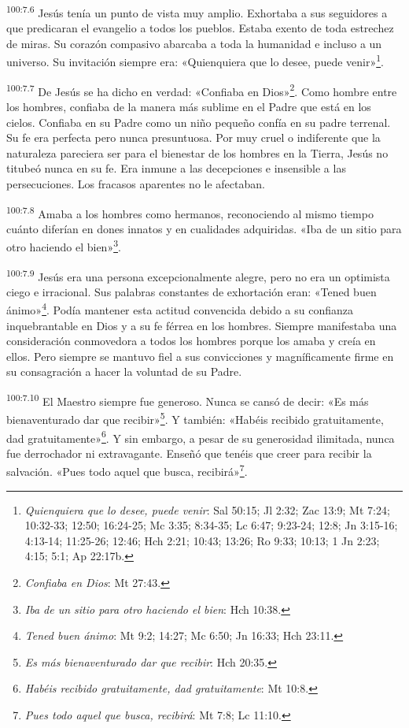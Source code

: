 \par
\textsuperscript{100:7.6} Jesús tenía un punto de vista muy amplio. Exhortaba a sus seguidores a que predicaran el evangelio a todos los pueblos. Estaba exento de toda estrechez de miras. Su corazón compasivo abarcaba a toda la humanidad e incluso a un universo. Su invitación siempre era: «Quienquiera que lo desee, puede venir»\footnote{\textit{Quienquiera que lo desee, puede venir}: Sal 50:15; Jl 2:32; Zac 13:9; Mt 7:24; 10:32-33; 12:50; 16:24-25; Mc 3:35; 8:34-35; Lc 6:47; 9:23-24; 12:8; Jn 3:15-16; 4:13-14; 11:25-26; 12:46; Hch 2:21; 10:43; 13:26; Ro 9:33; 10:13; 1 Jn 2:23; 4:15;  5:1; Ap 22:17b.}.

\par
\textsuperscript{100:7.7} De Jesús se ha dicho en verdad: «Confiaba en Dios»\footnote{\textit{Confiaba en Dios}: Mt 27:43.}. Como hombre entre los hombres, confiaba de la manera más sublime en el Padre que está en los cielos. Confiaba en su Padre como un niño pequeño confía en su padre terrenal. Su fe era perfecta pero nunca presuntuosa. Por muy cruel o indiferente que la naturaleza pareciera ser para el bienestar de los hombres en la Tierra, Jesús no titubeó nunca en su fe. Era inmune a las decepciones e insensible a las persecuciones. Los fracasos aparentes no le afectaban.

\par
\textsuperscript{100:7.8} Amaba a los hombres como hermanos, reconociendo al mismo tiempo cuánto diferían en dones innatos y en cualidades adquiridas. «Iba de un sitio para otro haciendo el bien»\footnote{\textit{Iba de un sitio para otro haciendo el bien}: Hch 10:38.}.

\par
\textsuperscript{100:7.9} Jesús era una persona excepcionalmente alegre, pero no era un optimista ciego e irracional. Sus palabras constantes de exhortación eran: «Tened buen ánimo»\footnote{\textit{Tened buen ánimo}: Mt 9:2; 14:27; Mc 6:50; Jn 16:33; Hch 23:11.}. Podía mantener esta actitud convencida debido a su confianza inquebrantable en Dios y a su fe férrea en los hombres. Siempre manifestaba una consideración conmovedora a todos los hombres porque los amaba y creía en ellos. Pero siempre se mantuvo fiel a sus convicciones y magníficamente firme en su consagración a hacer la voluntad de su Padre.

\par
\textsuperscript{100:7.10} El Maestro siempre fue generoso. Nunca se cansó de decir: «Es más bienaventurado dar que recibir»\footnote{\textit{Es más bienaventurado dar que recibir}: Hch 20:35.}. Y también: «Habéis recibido gratuitamente, dad gratuitamente»\footnote{\textit{Habéis recibido gratuitamente, dad gratuitamente}: Mt 10:8.}. Y sin embargo, a pesar de su generosidad ilimitada, nunca fue derrochador ni extravagante. Enseñó que tenéis que creer para recibir la salvación. «Pues todo aquel que busca, recibirá»\footnote{\textit{Pues todo aquel que busca, recibirá}: Mt 7:8; Lc 11:10.}.

